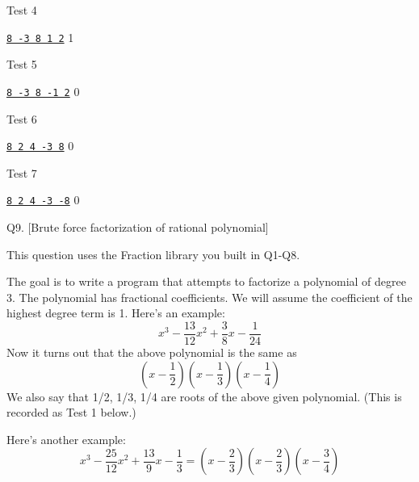 Test 4
\begin{console}[commandchars=\\\{\}]
\underline{\texttt{8 -3 8 1 2}}
1
\end{console}

Test 5
\begin{console}[commandchars=\\\{\}]
\underline{\texttt{8 -3 8 -1 2}}
0
\end{console}

Test 6
\begin{console}[commandchars=\\\{\}]
\underline{\texttt{8 2 4 -3 8}}
0
\end{console}

Test 7
\begin{console}[commandchars=\\\{\}]
\underline{\texttt{8 2 4 -3 -8}}
0
\end{console}




\newpage
Q9. [Brute force factorization of rational polynomial]

This question uses the Fraction library you built in Q1-Q8.

The goal is to write a program that attempts to factorize a polynomial of degree
3. The polynomial has fractional coefficients.
We will assume the coefficient of the highest degree term is 1.
Here's an example:
\[
  x^3 - \frac{13}{12} x^2 + \frac{3}{8}x - \frac{1}{24}
\]
Now it turns out that the above polynomial is the same as
\[
  \left( x - \frac{1}{2} \right)
  \left( x - \frac{1}{3} \right)
  \left( x - \frac{1}{4} \right)
\]
We also say that 1/2, 1/3, 1/4 are roots of the above given polynomial.
(This is recorded as Test 1 below.)

Here's another example:
\[
  x^3 - \frac{25}{12}x^2 + \frac{13}{9}x - \frac{1}{3} =
  \left( x - \frac{2}{3} \right)
  \left( x - \frac{2}{3} \right)
  \left( x - \frac{3}{4} \right)  
\]

